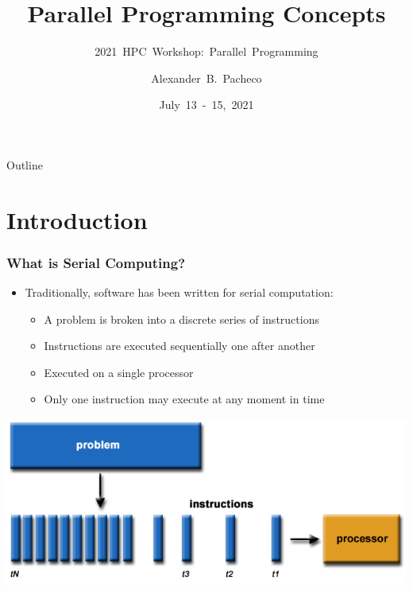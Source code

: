 \documentclass[10pt,t]{beamer}
\title{Parallel Programming Concepts}
\subtitle{2021~HPC~Workshop:~Parallel~Programming}
\author{\large{Alexander~B.~Pacheco}}
\institute[Lehigh University Research Computing]{\href{http://researchcomputing.lehigh.edu}{Research~Computing}}
\date{July~13~-~15,~2021}
\begin{document}
\begin{frame}
  \titlepage
\end{frame}

\begin{frame}[c]{Outline}
  \tableofcontents%
\end{frame}

\section{Introduction}
\begin{frame}
  \frametitle{What is Serial Computing?}
  \begin{itemize}
  \item Traditionally, software has been written for serial computation:
    \begin{itemize}
    \item A problem is broken into a discrete series of instructions
    \item Instructions are executed sequentially one after another
    \item Executed on a single processor
    \item Only one instruction may execute at any moment in time
    \end{itemize}
  \end{itemize}
  \includegraphics[width=\textwidth]{./serialProblem}
\end{frame}
\end{document}
